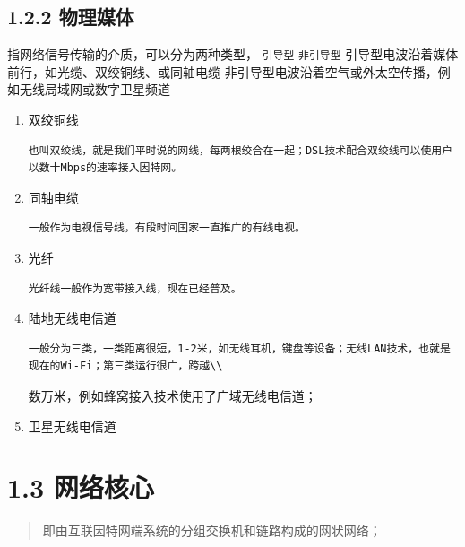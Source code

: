 \documentclass[11pt]{article}
\begin{document}
\subsection{1.2.2 物理媒体}
\label{sec:orgac0e9f2}
指网络信号传输的介质，可以分为两种类型， \texttt{引导型}  \texttt{非引导型}
引导型电波沿着媒体前行，如光缆、双绞铜线、或同轴电缆
非引导型电波沿着空气或外太空传播，例如无线局域网或数字卫星频道
\begin{enumerate}
\item 双绞铜线
\begin{verbatim}
也叫双绞线，就是我们平时说的网线，每两根绞合在一起；DSL技术配合双绞线可以使用户以数十Mbps的速率接入因特网。
\end{verbatim}
\item 同轴电缆
\begin{verbatim}
一般作为电视信号线，有段时间国家一直推广的有线电视。
\end{verbatim}
\item 光纤
\begin{verbatim}
光纤线一般作为宽带接入线，现在已经普及。
\end{verbatim}
\item 陆地无线电信道
\begin{verbatim}
一般分为三类，一类距离很短，1-2米，如无线耳机，键盘等设备；无线LAN技术，也就是现在的Wi-Fi；第三类运行很广，跨越\\
\end{verbatim}

数万米，例如蜂窝接入技术使用了广域无线电信道；
\item 卫星无线电信道
\end{enumerate}


\section{1.3 网络核心}
\label{sec:orgde4f677}
\begin{quote}
即由互联因特网端系统的分组交换机和链路构成的网状网络；
\end{quote}
\end{document}
